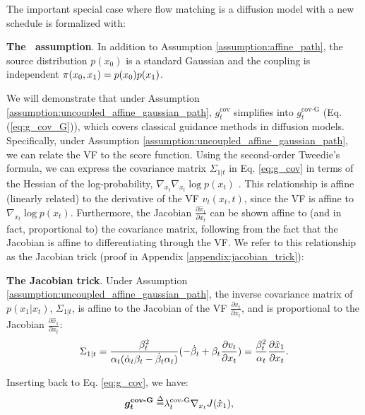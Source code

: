 The important special case where flow matching is a diffusion model with a new schedule is formalized with:
\begin{assumption}
    \label{assumption:uncoupled_affine_gaussian_path}
    \textbf{The \diffusionpath~assumption}.
    In addition to Assumption \ref{assumption:affine_path}, the source distribution $p(x_0)$ is a standard Gaussian and the coupling is independent $\pi(x_0,x_1) = p(x_0)p(x_1)$.
\end{assumption}
We will demonstrate that under Assumption \ref{assumption:uncoupled_affine_gaussian_path}, $g_t^{\text{cov}}$ simplifies into $g_t^{\text{cov-G}}$ (Eq. (\ref{eq:g_cov_G})), which covers classical guidance methods in diffusion models.
Specifically, under Assumption \ref{assumption:uncoupled_affine_gaussian_path}, we can relate the VF to the score function. Using the second-order Tweedie's formula, we can express the covariance matrix $\Sigma_{1|t}$ in Eq. \eqref{eq:g_cov} in terms of the Hessian of the log-probability, $\nabla_{x_t} \nabla_{x_t} \log p(x_t)$ \citep{rozet_learning_2024,boys_tweedie_2024,ye_tfg_2024}. 
This relationship is affine (linearly related) to the derivative of the VF $v_t(x_t,t)$, since the VF is affine to $\nabla_{x_t}\log p(x_t)$. Furthermore, the Jacobian $\frac{\partial \hat{x}_1}{\partial x_t}$ can be shown affine to (and in fact, proportional to) the covariance matrix, following from the fact that the Jacobian is affine to differentiating through the VF. 
We refer to this relationship as the Jacobian trick (proof in Appendix \ref{appendix:jacobian_trick}):
\begin{proposition} \textbf{The Jacobian trick}. Under Assumption \ref{assumption:uncoupled_affine_gaussian_path}, the inverse covariance matrix of $p(x_1|x_t)$, $\Sigma_{1|t}$, is affine to the Jacobian of the VF $\frac{\partial v_t}{\partial x_t}$, and is proportional to the Jacobian $\frac{\partial \hat{x}_1}{\partial x_t}$:
\vspace{-5pt}
\begin{equation}\nonumber
     \Sigma_{1|t}= \frac{\beta_t^2}{\alpha_t(\dot\alpha_t\beta_t - \dot\beta_t\alpha_t)} (-\dot\beta_t+ \beta_t\frac{\partial v_t}{\partial x_t} )
     = \frac{\beta_t^2}{\alpha_t} \frac{\partial \hat{x}_1}{\partial x_t}.
     \vspace{-10pt}
\end{equation}\label{proposition:jacobian_trick}
\end{proposition}
Inserting back to Eq. \eqref{eq:g_cov}, we have:
\begin{align}\label{eq:g_cov_G}
    \bm{g_t}^{\textbf{cov-G}}\overset{\Delta}{=}&\lambda^{\text{cov-G}}_t\nabla_{x_t}J(\hat{x}_1),
\end{align}
